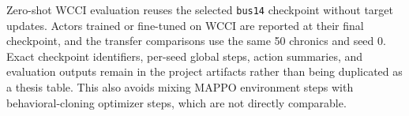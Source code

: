 {Zero-shot WCCI evaluation reuses the selected \texttt{bus14} checkpoint without
target updates. Actors trained or fine-tuned on WCCI are reported at their
final checkpoint, and the transfer comparisons use the same 50 chronics and
seed 0. Exact checkpoint identifiers, per-seed global steps, action summaries,
and evaluation outputs remain in the project artifacts rather than being
duplicated as a thesis table. This also avoids mixing MAPPO environment steps
with behavioral-cloning optimizer steps, which are not directly comparable.
}
